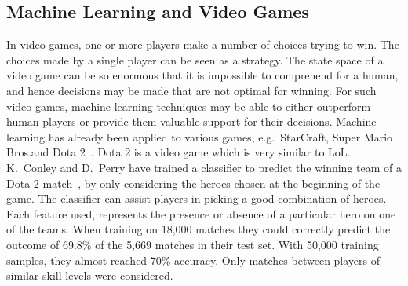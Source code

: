 \subsection{Machine Learning and Video Games}\label{sec:mlandonlinevideogames}
In video games, one or more players make a number of choices trying to win. The choices made by a single player can be seen as a strategy.
The state space of a video game can be so enormous that it is impossible to comprehend for a human, and hence decisions may be made that are not optimal for winning.
For such video games, machine learning techniques may be able to either outperform human players or provide them valuable support for their decisions.
Machine learning has already been applied to various games, e.g.\ StarCraft, Super Mario Bros.\@ and Dota 2~\cite{Park:2012:PES:2425296.2425298,supermario,dota2article}.
Dota 2 is a video game which is very similar to LoL.\@
K.\ Conley and D.\ Perry have trained a classifier to predict the winning team of a Dota 2 match~\cite{dota2article}, by only considering the heroes chosen at the beginning of the game. The classifier can assist players in picking a good combination of heroes.
Each feature used, represents the presence or absence of a particular hero on one of the teams.
When training on 18,000 matches they could correctly predict the outcome of 69.8\% of the 5,669 matches in their test set.
With 50,000 training samples, they almost reached 70\% accuracy. Only matches between players of similar skill levels were considered.

%
%



